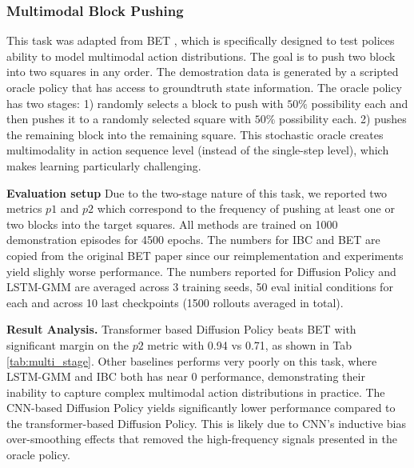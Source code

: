 \subsubsection{\textbf{Multimodal Block Pushing}} This task was adapted from BET \cite{bet}, which is specifically designed to test polices ability to model multimodal action distributions. The goal is to push two block into two squares in any order. The demostration data is generated by a scripted oracle policy that has access to groundtruth state information. The oracle policy has two stages: 1) randomly selects a block to push with $50\% $ possibility each and then pushes it to a randomly selected square with $50\% $ possibility each. 2) pushes the remaining block into the remaining square. This stochastic oracle creates multimodality in action sequence level (instead of the single-step level), which makes learning particularly challenging.

\textbf{Evaluation setup} Due to the two-stage nature of this task, we reported two metrics $p1$ and $p2$ which correspond to the frequency of pushing at least one or two blocks into the target squares. All methods are trained on 1000 demonstration episodes for 4500 epochs. The numbers for IBC and BET are copied from the original BET paper \cite{bet} since our reimplementation and experiments yield slighly worse performance. The numbers reported for Diffusion Policy and LSTM-GMM are averaged across 3 training seeds, 50 eval initial conditions for each and across 10 last checkpoints (1500 rollouts averaged in total).

\textbf{Result Analysis.} Transformer based Diffusion Policy beats BET \cite{bet} with significant margin on the $p2$ metric with 0.94 vs 0.71, as shown in Tab \ref{tab:multi_stage}. Other baselines performs very poorly on this task, where LSTM-GMM and IBC both has near 0 performance, demonstrating their inability to capture complex multimodal action distributions in practice. The CNN-based Diffusion Policy yields significantly lower performance compared to the transformer-based Diffusion Policy. This is likely due to CNN's inductive bias over-smoothing effects that removed the high-frequency signals presented in the oracle policy.

